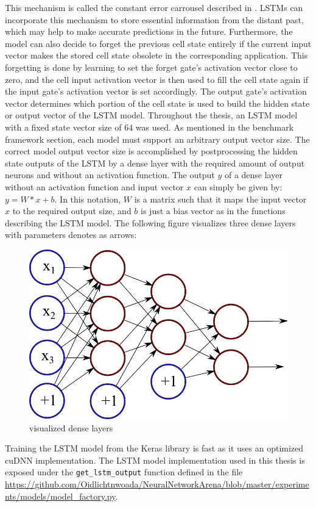 \documentclass[draft,final]{vutinfth} %
\begin{document}
    This mechanism is called the constant error carrousel described in \cite[p. 7]{LSTM}.
    LSTMs can incorporate this mechanism to store essential information from the distant past, which may help to make accurate predictions in the future.
    Furthermore, the model can also decide to forget the previous cell state entirely if the current input vector makes the stored cell state obsolete in the corresponding application.
    This forgetting is done by learning to set the forget gate's activation vector close to zero, and the cell input activation vector is then used to fill the cell state again if the input gate's activation vector is set accordingly.
    The output gate's activation vector determines which portion of the cell state is used to build the hidden state or output vector of the LSTM model.
    Throughout the thesis, an LSTM model with a fixed state vector size of $64$ was used. As mentioned in the benchmark framework section, each model must support an arbitrary output vector size.
    The correct model output vector size is accomplished by postprocessing the hidden state outputs of the LSTM by a dense layer with the required amount of output neurons and without an activation function.
    The output $y$ of a dense layer without an activation function and input vector $x$ can simply be given by: $y = W*x + b$.
    In this notation, $W$ is a matrix such that it maps the input vector $x$ to the required output size, and $b$ is just a bias vector as in the functions describing the LSTM model.
    The following figure visualizes three dense layers with parameters denotes as arrows:
    \begin{figure}[H]
        \centering{}
        \includegraphics[width=0.5\linewidth]{graphics/dense.png}
        \caption{visualized dense layers \cite{dense_vis}}
        \label{fig:lstm_vis}
    \end{figure}
    Training the LSTM model from the Keras library is fast as it uses an optimized cuDNN \cite{cuDNN} implementation.
    The LSTM model implementation used in this thesis is exposed under the \texttt{get\_lstm\_output} function defined in the file \url{https://github.com/Oidlichtnwoada/NeuralNetworkArena/blob/master/experiments/models/model_factory.py}.
\end{document}

